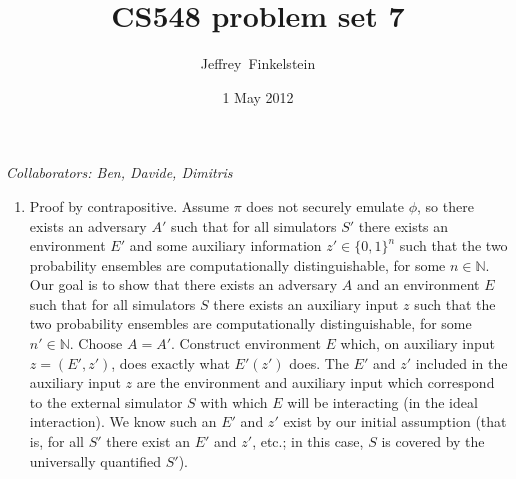 \documentclass[draft]{article}
\author{Jef{}frey~Finkelstein}
\date{1 May 2012}
\title{CS548 problem set 7}
\newcommand{\collaborators}[1]{\emph{Collaborators: #1}}
\begin{document}
\maketitle
\collaborators{Ben, Davide, Dimitris}
\begin{enumerate}
\item
  Proof by contrapositive.
  Assume $\pi$ does not securely emulate $\phi$, so there exists an adversary $A'$ such that for all simulators $S'$ there exists an environment $E'$ and some auxiliary information $z'\in\{0, 1\}^n$ such that the two probability ensembles are computationally distinguishable, for some $n\in\mathbb{N}$.
  Our goal is to show that there exists an adversary $A$ and an environment $E$ such that for all simulators $S$ there exists an auxiliary input $z$ such that the two probability ensembles are computationally distinguishable, for some $n'\in\mathbb{N}$.
  Choose $A=A'$.
  Construct environment $E$ which, on auxiliary input $z=(E', z')$, does exactly what $E'(z')$ does.
  The $E'$ and $z'$ included in the auxiliary input $z$ are the environment and auxiliary input which correspond to the external simulator $S$ with which $E$ will be interacting (in the ideal interaction).
  We know such an $E'$ and $z'$ exist by our initial assumption (that is, for all $S'$ there exist an $E'$ and $z'$, etc.; in this case, $S$ is covered by the universally quantified $S'$).


\end{enumerate}
\end{document}
